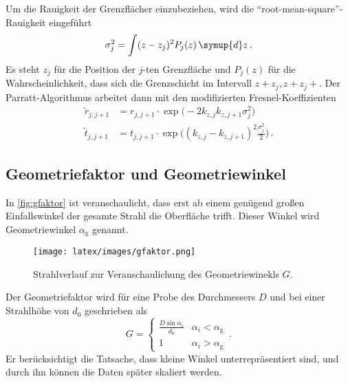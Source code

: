         \noindent
        Um die Rauigkeit der Grenzflächer einzubeziehen, wird die \enquote{root-mean-square}-Rauigkeit eingeführt
        \begin{equation*}
            \sigma_j^2 = \int (z - z_j)^2 P_j(z)\, \symup{d}z\, .
        \end{equation*}
        Es steht $z_j$ für die Position der $j$-ten Grenzfläche und $P_j(z)$ für die Wahrscheinlichkeit, dass sich die Grenzschicht im Intervall 
        $ z + z_j, z + z_j + $. 
        Der Parratt-Algorithmus arbeitet dann mit den modifizierten Fresnel-Koeffizienten
        \begin{align*}
            \tilde{r}_{j, j+1} &= r_{j, j+1} \cdot \exp\biggl( - 2 k_{z, j} k_{z, j+1} \sigma_j^2\biggr) \\
            \tilde{t}_{j, j+1} &= t_{j, j+1} \cdot \exp\biggl( (k_{z,j} - k_{z, j+1})^2 \frac{\sigma_j^2}{2}\biggr)\, .
        \end{align*}

    \subsection{Geometriefaktor und Geometriewinkel}

        \noindent 
        In \autoref{fig:gfaktor} ist veranschaulicht, dass erst ab einem genügend großen Einfallswinkel der gesamte Strahl die Oberfläche trifft. 
        Dieser Winkel wird Geometriewinkel $\alpha_\text{g}$ genannt. 
        \begin{figure}
            \centering
            \texttt{[image: latex/images/gfaktor.png]}
            \caption{Strahlverlauf zur Veranschaulichung des Geometriewinekls $G$. \cite{V44}}
            \label{fig:gfaktor}
        \end{figure}
        Der Geometriefaktor wird für eine Probe des Durchmessers $D$ und bei einer 
        Strahlhöhe von $d_0$ geschrieben als 
        \begin{equation*}
            G = \begin{cases}
                \frac{D \sin{\alpha_i}}{d_0} & \alpha_i < \alpha_\text{g} \\
                1 & \alpha_i > \alpha_\text{g}
            \end{cases}\, .
        \end{equation*}
        Er berücksichtigt die Tatsache, dass kleine Winkel unterrepräsentiert sind, und durch ihn können die Daten später skaliert werden. 